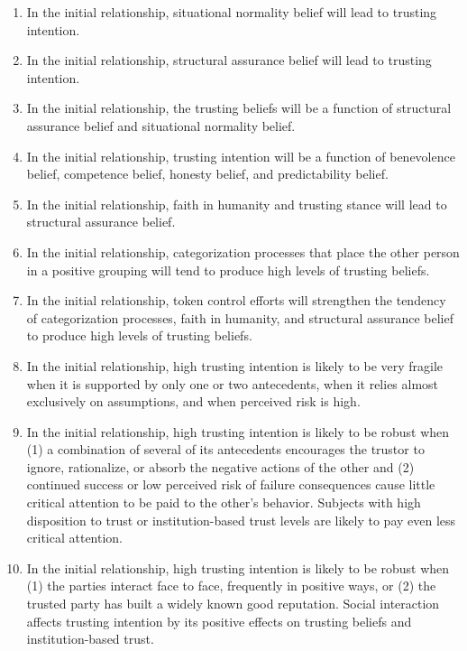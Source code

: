 \documentclass[10pt]{article}
\begin{document}
\begin{enumerate}
\item In the initial relationship, situational normality belief will lead to trusting intention.
\item In the initial relationship, structural assurance belief will lead to trusting intention.
\item In the initial relationship, the trusting beliefs will be a function of structural assurance belief and situational normality belief.
\item In the initial relationship, trusting intention will be a function of benevolence belief, competence belief, honesty belief, and predictability belief.
\item In the initial relationship, faith in humanity and trusting stance will lead to structural assurance belief.
\item In the initial relationship, categorization processes that place the other person in a positive grouping will tend to produce high levels of trusting beliefs.
\item In the initial relationship, token control efforts will strengthen the tendency of categorization processes, faith in humanity, and structural assurance belief to produce high levels of trusting beliefs.
\item In the initial relationship, high trusting intention is likely to be very fragile when it is supported
by only one or two antecedents, when it relies almost exclusively on assumptions, and when perceived risk is high.
\item In the initial relationship, high trusting intention is likely to be robust when (1) a combination of several of its antecedents encourages the trustor to ignore, rationalize, or absorb the negative actions of the other and (2) continued success or low perceived risk of failure consequences cause little critical attention to be paid to the other's behavior. Subjects with high disposition to trust or institution-based trust levels are likely to pay even less critical attention.
\item In the initial relationship, high trusting intention is likely to be robust when (1) the parties interact face to face, frequently in positive ways, or (2) the trusted party has built a widely known good reputation. Social interaction affects trusting intention by its positive effects on trusting beliefs and institution-based trust.

\end{enumerate}
\cite{mcknight1998initial}

\cite{bechky2006gaffers,Pickard509}
\balance{}


\end{document}
